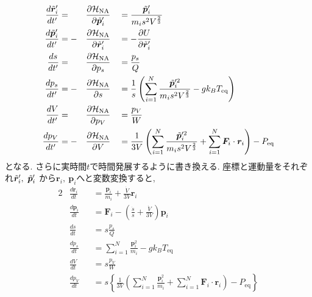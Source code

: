 \begin{alignat}{3}
 \frac{d \Tilde{\bm{r}}_{i}^{\prime}}{d t^{\prime}}
   &= &&\frac{\partial \mathcal{H}_{\mathrm{NA}}}{\partial \Tilde{\bm{p}}_{i}^{\prime}}
  &&=   \frac{\Tilde{\bm{p}}_{i}^{\prime}}{m_{i} s^{2} V^{\frac{2}{3}}}
 \label{eq:NoseAndersen3.1}
 \\
 \frac{d \Tilde{\bm{p}}_{i}^{\prime}}{d t^{\prime}}
  & = - &&\frac{\partial \mathcal{H}_{\mathrm{NA}}}{\partial \Tilde{\bm{r}}_{i}^{\prime}}
  &&= - \frac{\partial U}{\partial \Tilde{\bm{r}}_{i}^{\prime}}
 \label{eq:NoseAndersen3.2}
 \\
 \frac{d s}{d t^{\prime}}
  &= && \frac{\partial \mathcal{H}_{\mathrm{NA}}}{\partial p_{s}}
 &&=    \frac{p_{s}}{Q}
 \label{eq:NoseAndersen3.3}
 \\
 \frac{d p_{s}}{d t^{\prime}}
  &= - && \frac{\partial \mathcal{H}_{\mathrm{NA}}}{\partial s}
 &&= \frac{1}{s}\left(
                 \sum_{i=1}^{N} \frac{\Tilde{\bm{p}}_{i}^{\prime2}}{m_{i} s^{2} V^{\frac{2}{3}}}
                 - g k_{B} T_{\mathrm{eq}}
                 \right)
 \label{eq:NoseAndersen3.4}
 \\
 \frac{d V}{d t^{\prime}}
  &= &&\frac{\partial \mathcal{H}_{\mathrm{NA}}}{\partial p_{V}}
 &&=   \frac{p_{V}}{W}
 \label{eq:NoseAndersen3.5}
 \\
 \frac{d p_{V}}{d t^{\prime}}
  &= - &&\frac{\partial \mathcal{H}_{\mathrm{NA}}}{\partial V}
  &&= \frac{1}{3V}
   \left(
         \sum_{i=1}^{N} \frac{\Tilde{\bm{p}}_{i}^{\prime 2}}{m_{i} s^{2} V^{\frac{2}{3}}}
       + \sum_{i=1}^{N} \bm{F}_{i} \cdot \bm{r}_{i}
   \right)
   - P_{\mathrm{eq}}
 \label{eq:NoseAndersen3.6}
\end{alignat}
となる. さらに実時間$t$で時間発展するように書き換える. 
座標と運動量をそれぞれ$\Tilde{\bm{r}}_{i}^{\prime},~\Tilde{\bm{p}}_{i}^{\prime}$
から$\bm{r}_{i},~\bm{p}_{i}$へと変数変換すると, 
\begin{alignat}{2}
 &\frac{d \bm{r}_{i}}{d t}
 &&=
 \frac{\bm{p}_{i}}{m_{i}} + \frac{\dot{V}}{3V}\bm{r}_{i}
 \label{eq:NoseAndersen4.1}
 \\
 &\frac{d \bm{p}_{i}}{d t}
 &&=
  \bm{F}_{i} - \left( \frac{\dot{s}}{s} + \frac{\dot{V}}{3V} \right) \bm{p}_{i}
 \label{eq:NoseAndersen4.2}
 \\
 &\frac{d s}{d t}
 &&=
 s \frac{p_{s}}{Q}
 \label{eq:NoseAndersen4.3}
 \\
 &\frac{d p_{s}}{d t}
 &&=
 \sum_{i=1}^{N} \frac{\bm{p}_{i}^{2}}{m_{i}} - g k_{B} T_{\mathrm{eq}}
 \label{eq:NoseAndersen4.4}
 \\
 &\frac{d V}{d t}
 &&= s \frac{p_{V}}{W}
 \label{eq:NoseAndersen4.5}
 \\
 &\frac{d p_{V}}{d t}
 &&= s \left\{
       \frac{1}{3V}
       \left(
             \sum_{i=1}^{N} \frac{\bm{p}_{i}^{2}}{m_{i}}
           + \sum_{i=1}^{N} \bm{F}_{i} \cdot \bm{r}_{i}
       \right)
       - P_{\mathrm{eq}}
       \right\}
 \label{eq:NoseAndersen4.6}
\end{alignat}
